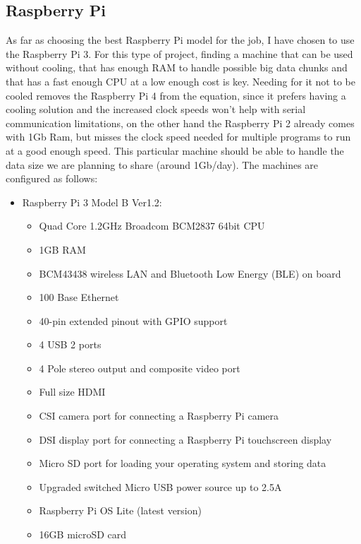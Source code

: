 \documentclass[a4paper,11pt]{scrartcl}
\begin{document}
\subsection{Raspberry Pi}
As far as choosing the best Raspberry Pi model for the job, I have chosen to use the Raspberry Pi 3. For this type of project, finding a machine that can be used without cooling, that has enough RAM to handle possible big data chunks and that has a fast enough CPU at a low enough cost is key. Needing for it not to be cooled removes the Raspberry Pi 4 from the equation, since it prefers having a cooling solution and the increased clock speeds won't help with serial communication limitations, on the other hand the Raspberry Pi 2 already comes with 1Gb Ram, but misses the clock speed needed for multiple programs to run at a good enough speed. 
This particular machine should be able to handle the data size we are planning to share (around 1Gb/day). The machines are configured as follows:
\begin{itemize}
    \item Raspberry Pi 3 Model B Ver1.2:
    \begin{itemize}
        \item Quad Core 1.2GHz Broadcom BCM2837 64bit CPU
        \item 1GB RAM
        \item BCM43438 wireless LAN and Bluetooth Low Energy (BLE) on board
        \item 100 Base Ethernet
        \item 40-pin extended pinout with GPIO support
        \item 4 USB 2 ports
        \item 4 Pole stereo output and composite video port
        \item Full size HDMI
        \item CSI camera port for connecting a Raspberry Pi camera
        \item DSI display port for connecting a Raspberry Pi touchscreen display
        \item Micro SD port for loading your operating system and storing data
        \item Upgraded switched Micro USB power source up to 2.5A
        \item Raspberry Pi OS Lite (latest version)
        \item 16GB microSD card
    \end{itemize}
\end{itemize}
\end{document}
